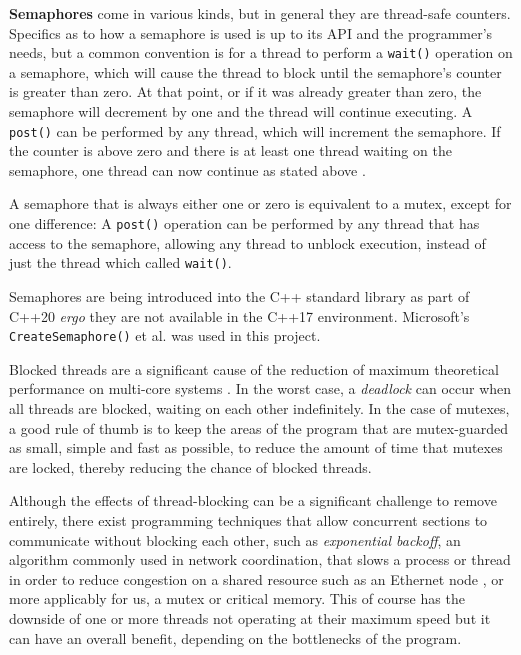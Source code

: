 \documentclass[11pt, a4paper, twocolumn]{article}
\begin{document}
\textbf{Semaphores} come in various kinds, but in general they are thread-safe counters. Specifics as to how a semaphore is used is up to its API and the programmer's needs, but a common convention is for a thread to perform a \verb|wait()| operation on a semaphore, which will cause the thread to block until the semaphore's counter is greater than zero. At that point, or if it was already greater than zero, the semaphore will decrement by one and the thread will continue executing. A \verb|post()| can be performed by any thread, which will increment the semaphore. If the counter is above zero and there is at least one thread waiting on the semaphore, one thread can now continue as stated above \citep{BoostSync}.

A semaphore that is always either one or zero is equivalent to a mutex, except for one difference: A \verb|post()| operation can be performed by any thread that has access to the semaphore, allowing any thread to unblock execution, instead of just the thread which called \verb|wait()|.

Semaphores are being introduced into the C++ standard library as part of C++20 \citep{C20Sync} \emph{ergo} they are not available in the C++17 environment. Microsoft's \verb|CreateSemaphore()| et al. \citep{MicrosoftSemaphore} was used in this project.

Blocked threads are a significant cause of the reduction of maximum theoretical performance on multi-core systems \citep{Alemany1992}. In the worst case, a \emph{deadlock} can occur when all threads are blocked, waiting on each other indefinitely. In the case of mutexes, a good rule of thumb is to keep the areas of the program that are mutex-guarded as small, simple and fast as possible, to reduce the amount of time that mutexes are locked, thereby reducing the chance of blocked threads.

Although the effects of thread-blocking can be a significant challenge to remove entirely, there exist programming techniques that allow concurrent sections to communicate without blocking each other, such as \emph{exponential backoff}, an algorithm commonly used in network coordination, that slows a process or thread in order to reduce congestion on a shared resource such as an Ethernet node \citep{Goodman2019}, or more applicably for us, a mutex or critical memory. This of course has the downside of one or more threads not operating at their maximum speed but it can have an overall benefit, depending on the bottlenecks of the program.
\end{document}
